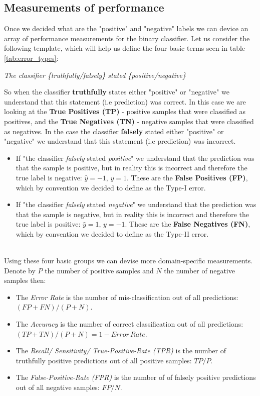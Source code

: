 \subsection{Measurements of performance}
Once we decided what are the "positive" and "negative" labels we can device an array of performance measurements for the binary classifier. Let us consider the following template, which will help us define the four basic terms seen in table \ref{tab:error_types}:
\begin{center}
	\textit{The classifier \{truthfully/falsely\} stated \{positive/negative\}}
\end{center}

So when the classifier \textbf{truthfully} states either "positive" or "negative" we understand that this statement (i.e prediction) was correct. In this case we are looking at the \textbf{True Positives (TP)} - positive samples that were classified as positives, and the \textbf{True Negatives (TN)} - negative samples that were classified as negatives. In the case the classifier \textbf{falsely} stated either "positive" or "negative" we understand that this statement (i.e prediction) was incorrect.
\begin{itemize}
	\item If "the classifier \textit{falsely} stated \textit{positive}" we understand that the prediction was that the sample is positive, but in reality this is incorrect and therefore the true label is negative: $\widehat{y}=-1,\, y=1$. These are the \textbf{False Positives (FP)}, which by convention we decided to define as the Type-I error.
	\item If "the classifier \textit{falsely} stated \textit{negative}" we understand that the prediction was that the sample is negative, but in reality this is incorrect and therefore the true label is positive: $\widehat{y}=1,\, y=-1$. These are the \textbf{False Negatives (FN)}, which by convention we decided to define as the Type-II error.
\end{itemize}

~\\
Using these four basic groups we can devise more domain-specific measurements. Denote by $P$ the number of positive samples and $N$ the number of negative samples then:
\begin{itemize}
	\item The \textit{Error Rate} is the number of mis-classification out of all predictions: $\left(FP+FN\right)/\left(P+N\right)$.
	\item The \textit{Accuracy} is the number of correct classification out of all predictions: $\left(TP+TN\right)/\left(P+N\right)=1-Error\,Rate$.
	\item The \textit{Recall/ Sensitivity/ True-Positive-Rate (TPR)} is the number of truthfully positive predictions out of all positive samples: $TP/P$.
	\item The \textit{False-Positive-Rate (FPR)} is the number of of falsely positive predictions out of all negative samples: $FP/N$.
\end{itemize}

